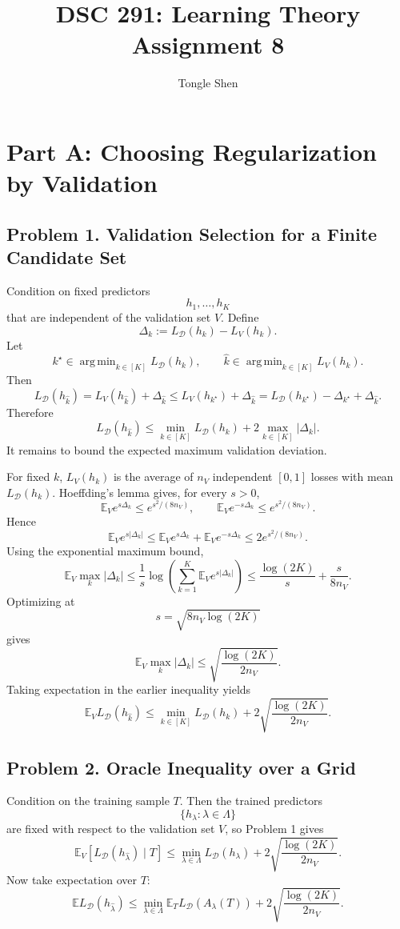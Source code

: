 \documentclass{article}
\title{DSC 291: Learning Theory Assignment 8}
\author{Tongle Shen}
\DeclareMathOperator*{\argmin}{arg\,min}
\newcommand{\EE}{\mathbb{E}}
\newcommand{\cD}{\mathcal{D}}
\begin{document}
\maketitle

\section{Part A: Choosing Regularization by Validation}

\subsection{Problem 1. Validation Selection for a Finite Candidate Set}

Condition on fixed predictors
$$
h_1,\dots,h_K
$$
that are independent of the validation set $V$. Define
$$
\Delta_k := L_{\cD}(h_k)-L_V(h_k).
$$
Let
$$
k^\star\in \argmin_{k\in[K]} L_{\cD}(h_k),
\qquad
\widehat{k}\in \argmin_{k\in[K]} L_V(h_k).
$$
Then
$$
L_{\cD}(h_{\widehat{k}})
=
L_V(h_{\widehat{k}})+\Delta_{\widehat{k}}
\le
L_V(h_{k^\star})+\Delta_{\widehat{k}}
=
L_{\cD}(h_{k^\star})-\Delta_{k^\star}+\Delta_{\widehat{k}}.
$$
Therefore
$$
L_{\cD}(h_{\widehat{k}})
\le
\min_{k\in[K]}L_{\cD}(h_k)+2\max_{k\in[K]}|\Delta_k|.
$$
It remains to bound the expected maximum validation deviation.

For fixed $k$, $L_V(h_k)$ is the average of $n_V$ independent $[0,1]$ losses with mean $L_{\cD}(h_k)$. Hoeffding's lemma gives, for every $s>0$,
$$
\EE_V e^{s\Delta_k}\le e^{s^2/(8n_V)},
\qquad
\EE_V e^{-s\Delta_k}\le e^{s^2/(8n_V)}.
$$
Hence
$$
\EE_V e^{s|\Delta_k|}
\le
\EE_V e^{s\Delta_k}+\EE_V e^{-s\Delta_k}
\le
2e^{s^2/(8n_V)}.
$$
Using the exponential maximum bound,
$$
\EE_V\max_k |\Delta_k|
\le
\frac1s\log\left(\sum_{k=1}^K \EE_V e^{s|\Delta_k|}\right)
\le
\frac{\log(2K)}{s}+\frac{s}{8n_V}.
$$
Optimizing at
$$
s=\sqrt{8n_V\log(2K)}
$$
gives
$$
\EE_V\max_k |\Delta_k|
\le
\sqrt{\frac{\log(2K)}{2n_V}}.
$$
Taking expectation in the earlier inequality yields
$$
\EE_V L_{\cD}(h_{\widehat{k}})
\le
\min_{k\in[K]}L_{\cD}(h_k)
+
2\sqrt{\frac{\log(2K)}{2n_V}}.
$$

\subsection{Problem 2. Oracle Inequality over a Grid}

Condition on the training sample $T$. Then the trained predictors
$$
\{h_\lambda:\lambda\in\Lambda\}
$$
are fixed with respect to the validation set $V$, so Problem 1 gives
$$
\EE_V\!\left[L_{\cD}(h_{\widehat{\lambda}})\mid T\right]
\le
\min_{\lambda\in\Lambda}L_{\cD}(h_\lambda)
+
2\sqrt{\frac{\log(2K)}{2n_V}}.
$$
Now take expectation over $T$:
$$
\EE L_{\cD}(h_{\widehat{\lambda}})
\le
\min_{\lambda\in\Lambda}\EE_T L_{\cD}(A_\lambda(T))
+
2\sqrt{\frac{\log(2K)}{2n_V}}.
$$
\end{document}
